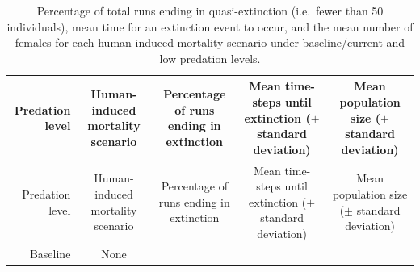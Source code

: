 \documentclass[11pt,]{article}
\begin{document}
\begin{longtable}[]{@{}rcccc@{}}
\caption{Percentage of total runs ending in quasi-extinction (i.e.~fewer
than 50 individuals), mean time for an extinction event to occur, and
the mean number of females for each human-induced mortality scenario
under baseline/current and low predation levels.}\tabularnewline
\toprule
\begin{minipage}[b]{0.16\columnwidth}\raggedleft
Predation level\strut
\end{minipage} & \begin{minipage}[b]{0.17\columnwidth}\centering
Human-induced mortality scenario\strut
\end{minipage} & \begin{minipage}[b]{0.17\columnwidth}\centering
Percentage of runs ending in extinction\strut
\end{minipage} & \begin{minipage}[b]{0.17\columnwidth}\centering
Mean time-steps until extinction (\(\pm\) standard deviation)\strut
\end{minipage} & \begin{minipage}[b]{0.17\columnwidth}\centering
Mean population size (\(\pm\) standard deviation)\strut
\end{minipage}\tabularnewline
\midrule
\endfirsthead
\toprule
\begin{minipage}[b]{0.16\columnwidth}\raggedleft
Predation level\strut
\end{minipage} & \begin{minipage}[b]{0.17\columnwidth}\centering
Human-induced mortality scenario\strut
\end{minipage} & \begin{minipage}[b]{0.17\columnwidth}\centering
Percentage of runs ending in extinction\strut
\end{minipage} & \begin{minipage}[b]{0.17\columnwidth}\centering
Mean time-steps until extinction (\(\pm\) standard deviation)\strut
\end{minipage} & \begin{minipage}[b]{0.17\columnwidth}\centering
Mean population size (\(\pm\) standard deviation)\strut
\end{minipage}\tabularnewline
\midrule
\endhead
\begin{minipage}[t]{0.16\columnwidth}\raggedleft
Baseline\strut
\end{minipage} & \begin{minipage}[t]{0.17\columnwidth}\centering
None\strut

\end{minipage}
\end{longtable}
\end{document}
